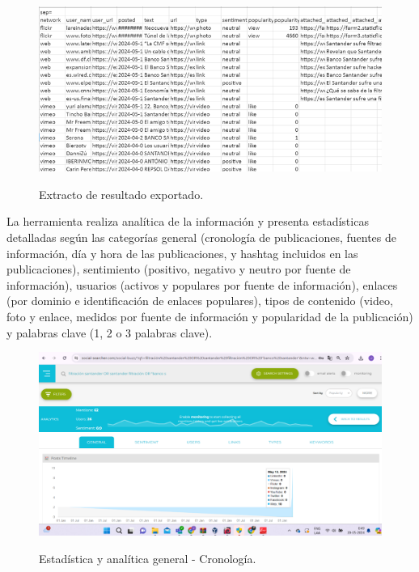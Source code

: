 \documentclass[stu, 11pt, letterpaper, donotrepeattitle, floatsintext, natbib]{apa7}
\begin{document}
\begin{figure}[H]
\centering
\caption{Extracto de resultado exportado.}
\includegraphics[width=0.75\linewidth]{osi16.png} %
\label{fig:OverallEffect}
\end{figure}

La herramienta realiza analítica de la información y presenta estadísticas detalladas según las categorías general (cronología de publicaciones, fuentes de información, día y hora de las publicaciones, y hashtag incluidos en las publicaciones), sentimiento (positivo, negativo y neutro por fuente de información), usuarios (activos y populares por fuente de información), enlaces (por dominio e identificación de enlaces populares), tipos de contenido (video, foto y enlace, medidos por fuente de información y popularidad de la publicación) y palabras clave (1, 2 o 3 palabras clave).

\begin{figure}[H]
\centering
\caption{Estadística y analítica general - Cronología.}
\includegraphics[width=0.75\linewidth]{osi17.png} %
\label{fig:OverallEffect}
\end{figure}
\end{document}
